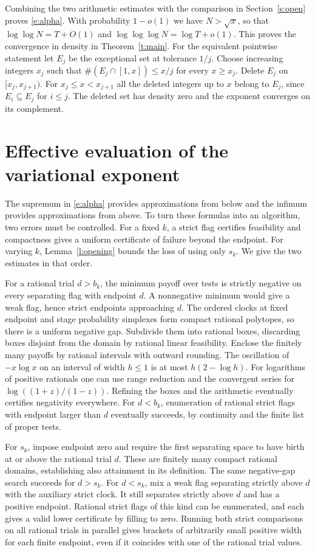 \documentclass[11pt]{article}
\numberwithin{equation}{section}
\begin{document}
Combining the two arithmetic estimates with the
comparison in Section~\ref{s:open} proves \eqref{e:alpha}.
With probability $1-o(1)$ we have $N>\sqrt{x}$, so that
$\log\log N=T+O(1)$ and $\log\log\log N=\log T+o(1)$.
This proves the convergence in density in Theorem~\ref{t:main}.
For the equivalent pointwise statement let $E_j$ be the exceptional
set at tolerance $1/j$. Choose increasing integers $x_j$ such that
$\#(E_j\cap[1,x])\le x/j$ for every $x\ge x_j$. Delete $E_j$
on $[x_j,x_{j+1})$. For $x_j\le x<x_{j+1}$ all the deleted
integers up to $x$ belong to $E_j$, since $E_i\subseteq E_j$
for $i\le j$. The deleted set has density zero and the exponent
converges on its complement.

\section{Effective evaluation of the variational exponent}\label{s:eval}

The supremum in \eqref{e:alpha} provides approximations from
below and the infimum provides approximations from above. To turn
these formulas into an algorithm, two errors must be controlled.
For a fixed $k$, a strict flag certifies feasibility and compactness
gives a uniform certificate of failure beyond the endpoint.
For varying $k$, Lemma~\ref{l:opening} bounds the loss of using
only $s_k$. We give the two estimates in that order.

For a rational trial $d>b_k$, the minimum payoff over tests is
strictly negative on every separating flag with endpoint $d$.
A nonnegative minimum would give a weak flag, hence strict
endpoints approaching $d$. The ordered clocks at fixed endpoint
and stage probability simplexes form compact rational polytopes,
so there is a uniform negative gap. Subdivide them into rational
boxes, discarding boxes disjoint from the domain by rational
linear feasibility. Enclose the finitely many payoffs by rational
intervals with outward rounding. The oscillation of $-x\log x$
on an interval of width $h\le1$ is at most $h(2-\log h)$. For
logarithms of positive rationals one can use range reduction
and the convergent series for $\log((1+z)/(1-z))$. Refining the
boxes and the arithmetic eventually certifies negativity everywhere.
For $d<b_k$, enumeration of rational strict flags with endpoint
larger than $d$ eventually succeeds, by continuity and the finite
list of proper tests.

For $s_k$, impose endpoint zero and require the first separating
space to have birth at or above the rational trial $d$. These
are finitely many compact rational domains, establishing also
attainment in its definition. The same negative-gap search succeeds
for $d>s_k$. For $d<s_k$, mix a weak flag separating strictly
above $d$ with the auxiliary strict clock. It still separates
strictly above $d$ and has a positive endpoint. Rational strict
flags of this kind can be enumerated, and each gives a valid
lower certificate by filling to zero. Running both strict
comparisons on all rational trials in parallel gives brackets
of arbitrarily small positive width for each finite endpoint, even
if it coincides with one of the rational trial values.
\end{document}
